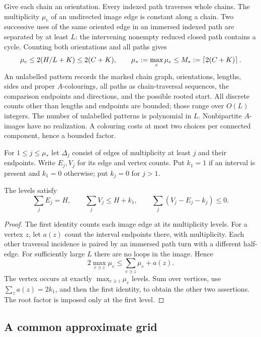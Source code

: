Give each chain an orientation. Every indexed path traverses whole chains. The multiplicity $\mu_e$ of an undirected image edge is constant along a chain. Two successive uses of the same oriented edge in an immersed indexed path are separated by at least $L$: the intervening nonempty reduced closed path contains a cycle. Counting both orientations and all paths gives
\begin{equation}\label{eq:multiplicity-bound}
 \mu_e\le2(H/L+K)\le2(C+K),\qquad
 \mu_*:=\max_e\mu_e\le M_*:=\left\lceil 2(C+K)\right\rceil.
\end{equation}
An unlabelled pattern records the marked chain graph, orientations, lengths, sides and proper $A$-colourings, all paths as chain-traversal sequences, the comparison endpoints and directions, and the possible rooted start. All discrete counts other than lengths and endpoints are bounded; those range over $O(L)$ integers. The number of unlabelled patterns is polynomial in $L$. Nonbipartite $A$-images have no realization. A colouring costs at most two choices per connected component, hence a bounded factor.

For $1\le j\le\mu_*$ let $\Delta_j$ consist of edges of multiplicity at least $j$ and their endpoints. Write $E_j,V_j$ for its edge and vertex counts. Put $k_1=1$ if an interval is present and $k_1=0$ otherwise; put $k_j=0$ for $j>1$.
\begin{lemma}\label{lem:multi-incidence}
The levels satisfy
\begin{equation}\label{eq:multi-incidence}
 \sum_j E_j=H,\qquad \sum_j V_j\le H+k_1,
 \qquad \sum_j(V_j-E_j-k_j)\le0.
\end{equation}
\end{lemma}
\begin{proof}
The first identity counts each image edge at its multiplicity levels. For a vertex $z$, let $a(z)$ count the interval endpoints there, with multiplicity. Each other traversal incidence is paired by an immersed path turn with a different half-edge. For sufficiently large $L$ there are no loops in the image. Hence
\[
 2\max_{e\ni z}\mu_e\le\sum_{e\ni z}\mu_e+a(z).
\]
The vertex occurs at exactly $\max_{e\ni z}\mu_e$ levels. Sum over vertices, use $\sum_z a(z)=2k_1$, and then the first identity, to obtain the other two assertions. The root factor is imposed only at the first level.
\end{proof}

\subsection{A common approximate grid}

